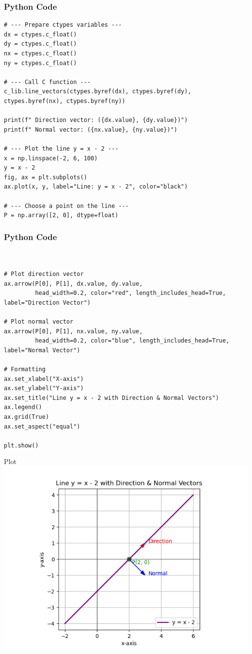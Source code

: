 \documentclass{beamer}
\begin{document}
\begin{frame}[fragile]
    \frametitle{Python Code}
    \begin{lstlisting}
# --- Prepare ctypes variables ---
dx = ctypes.c_float()
dy = ctypes.c_float()
nx = ctypes.c_float()
ny = ctypes.c_float()

# --- Call C function ---
c_lib.line_vectors(ctypes.byref(dx), ctypes.byref(dy), ctypes.byref(nx), ctypes.byref(ny))

print(f" Direction vector: ({dx.value}, {dy.value})")
print(f" Normal vector: ({nx.value}, {ny.value})")

# --- Plot the line y = x - 2 ---
x = np.linspace(-2, 6, 100)
y = x - 2
fig, ax = plt.subplots()
ax.plot(x, y, label="Line: y = x - 2", color="black")

# --- Choose a point on the line ---
P = np.array([2, 0], dtype=float)
        \end{lstlisting}
\end{frame}

\begin{frame}[fragile]
    \frametitle{Python Code}
    \begin{lstlisting}


# Plot direction vector
ax.arrow(P[0], P[1], dx.value, dy.value, 
         head_width=0.2, color="red", length_includes_head=True, label="Direction Vector")

# Plot normal vector
ax.arrow(P[0], P[1], nx.value, ny.value, 
         head_width=0.2, color="blue", length_includes_head=True, label="Normal Vector")

# Formatting
ax.set_xlabel("X-axis")
ax.set_ylabel("Y-axis")
ax.set_title("Line y = x - 2 with Direction & Normal Vectors")
ax.legend()
ax.grid(True)
ax.set_aspect("equal")

plt.show()
        \end{lstlisting}
\end{frame}


\begin{frame}{Plot}
    \centering
    \includegraphics[width=\columnwidth, height=0.8\textheight, keepaspectratio]{Figs/Fig1.png}     
\end{frame}
\end{document}

